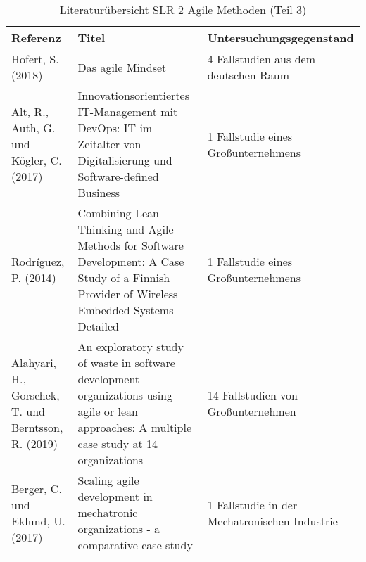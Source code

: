 \begin{table}[ht]
	\caption{Literaturübersicht SLR 2 Agile Methoden (Teil 3)}
	\centering
	\begin{tabularx}{500px}{|X|X|X|}
		\hline
		\textbf{Referenz}                                            & \textbf{Titel}                                                                                                                                                                   & \textbf{Untersuchungsgegenstand}                                                                                                                                         \\
		\hline
		Hofert, S. (2018)                                   & Das agile Mindset                                                                                                                             & 4 Fallstudien aus dem deutschen Raum                                                                        \\
		Alt, R., Auth, G. und Kögler, C. (2017)             & Innovationsorientiertes IT-Management mit DevOps: IT im Zeitalter von Digitalisierung und Software-defined Business                           & 1 Fallstudie eines Großunternehmens                                                                         \\
		Rodríguez, P. (2014)                                & Combining Lean Thinking and Agile Methods for Software Development: A Case Study of a Finnish Provider of Wireless Embedded Systems Detailed  & 1 Fallstudie eines Großunternehmens                                                                         \\
		Alahyari, H., Gorschek, T. und Berntsson, R. (2019) & An exploratory study of waste in software development organizations using agile or lean approaches: A multiple case study at 14 organizations & 14 Fallstudien von Großunternehmen                                                                          \\
		Berger, C. und Eklund, U. (2017)                    & Scaling agile development in mechatronic organizations - a comparative case study                                                             & 1 Fallstudie in der Mechatronischen Industrie   \\
		\hline                                                                                          
	\end{tabularx}
	\label{tab:overviewliterature2-3}
\end{table}